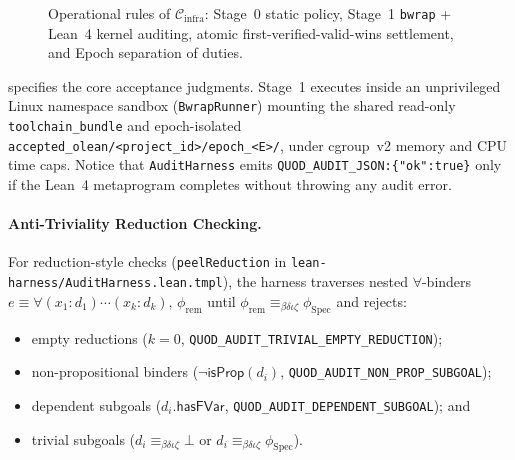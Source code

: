 \documentclass[sigplan,nonacm,10pt]{acmart}
\newcommand{\Cinfra}{\mathcal{C}_{\mathrm{infra}}}
\newcommand{\Truth}{\mathcal{E}}
\newcommand{\Orch}{\mathcal{G}}
\newcommand{\Ledger}{\mathcal{L}}
\newcommand{\Events}{\Lambda}
\newcommand{\Spec}{\mathrm{Spec}}
\newcommand{\DefEq}{\equiv_{\beta\delta\iota\zeta}}
\newcommand{\kw}[1]{\mathsf{#1}}
\newcommand{\code}[1]{\texttt{#1}}
\begin{document}
\begin{figure}[t]
\begin{minipage}{\textwidth}
\end{minipage}
\caption{Operational rules of $\Cinfra$: Stage~0 static policy, Stage~1 \code{bwrap} + Lean~4 kernel auditing, atomic first-verified-valid-wins settlement, and Epoch separation of duties.}
\label{fig:verification-rules}
\end{figure}

 specifies the core acceptance judgments. Stage~1 executes inside an unprivileged Linux namespace sandbox (\code{BwrapRunner}) mounting the shared read-only \code{toolchain\_bundle} and epoch-isolated \code{accepted\_\-olean/\-<project\_id>/\-epoch\_<E>/}, under cgroup~v2 memory and CPU time caps. Notice that \code{AuditHarness} emits \code{QUOD\_AUDIT\_JSON:\{"ok":true\}} only if the Lean~4 metaprogram completes without throwing any audit error.

\paragraph{Anti-Triviality Reduction Checking.}
For reduction-style checks (\code{peelReduction} in \code{lean-harness/\-Audit\-Harness.\-lean.\-tmpl}), the harness traverses nested $\forall$-binders $e \equiv \forall (x_1 : d_1) \cdots (x_k : d_k),\, \phi_{\mathrm{rem}}$ until $\phi_{\mathrm{rem}} \DefEq \phi_{\Spec}$ and rejects:
\begin{itemize}
  \item empty reductions ($k = 0$, \code{QUOD\_\-AUDIT\_\-TRIVIAL\_\-EMPTY\_\-REDUCTION});
  \item non-propositional binders ($\neg\kw{isProp}(d_i)$, \code{QUOD\_\-AUDIT\_\-NON\_\-PROP\_\-SUBGOAL});
  \item dependent subgoals ($d_i.\kw{hasFVar}$, \code{QUOD\_\-AUDIT\_\-DEPENDENT\_\-SUBGOAL}); and
  \item trivial subgoals ($d_i \DefEq \bot$ or $d_i \DefEq \phi_{\Spec}$).
\end{itemize}
\end{document}
